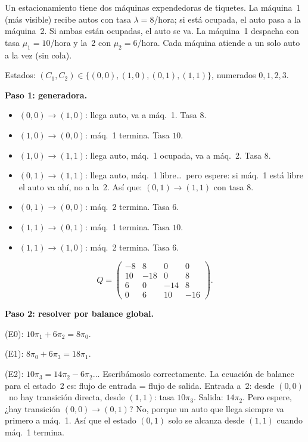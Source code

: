 \documentclass[11pt,a4paper]{article}
\theoremstyle{definition}
\theoremstyle{remark}
\begin{document}
\begin{ejemplo}
Un estacionamiento tiene dos máquinas expendedoras de tiquetes.  La
máquina~1 (más visible) recibe autos con tasa $\lambda=8$/hora; si está
ocupada, el auto pasa a la máquina~2.  Si ambas están ocupadas, el auto
se va.  La máquina~1 despacha con tasa $\mu_1=10$/hora y la~2 con
$\mu_2=6$/hora.  Cada máquina atiende a un solo auto a la vez (sin cola).

Estados: $(C_1,C_2)\in\{(0,0),(1,0),(0,1),(1,1)\}$, numerados
$0,1,2,3$.

\tcblower

\textbf{Paso 1: generadora.}

\begin{itemize}[nosep]
  \item $(0,0)\to(1,0)$: llega auto, va a máq.~1. Tasa $8$.
  \item $(1,0)\to(0,0)$: máq.~1 termina. Tasa $10$.
  \item $(1,0)\to(1,1)$: llega auto, máq.~1 ocupada, va a máq.~2. Tasa $8$.
  \item $(0,1)\to(1,1)$: llega auto, máq.~1 libre\ldots\ pero espere:
        si máq.~1 está libre el auto va ahí, no a la~2.  Así que:
        $(0,1)\to(1,1)$ con tasa $8$.
  \item $(0,1)\to(0,0)$: máq.~2 termina. Tasa $6$.
  \item $(1,1)\to(0,1)$: máq.~1 termina. Tasa $10$.
  \item $(1,1)\to(1,0)$: máq.~2 termina. Tasa $6$.
\end{itemize}

\[
  Q = \begin{pmatrix}
    -8  & 8   & 0  & 0   \\
    10  & -18 & 0  & 8   \\
    6   & 0   & -14 & 8  \\
    0   & 6   & 10 & -16
  \end{pmatrix}.
\]

\textbf{Paso 2: resolver por balance global.}

(E0): $10\pi_1 + 6\pi_2 = 8\pi_0$.

(E1): $8\pi_0 + 6\pi_3 = 18\pi_1$.

(E2): $10\pi_3 = 14\pi_2 - 6\pi_2 \ldots$ Escribámoslo correctamente.
La ecuación de balance para el estado~2 es: flujo de entrada = flujo de
salida.  Entrada a~2: desde $(0,0)$~no hay transición directa, desde
$(1,1)$: tasa $10\pi_3$.  Salida: $14\pi_2$.  Pero espere,
¿hay transición $(0,0)\to(0,1)$?  No, porque un auto que llega siempre
va primero a máq.~1.  Así que el estado $(0,1)$ solo se alcanza desde
$(1,1)$ cuando máq.~1 termina.


\end{ejemplo}
\end{document}

